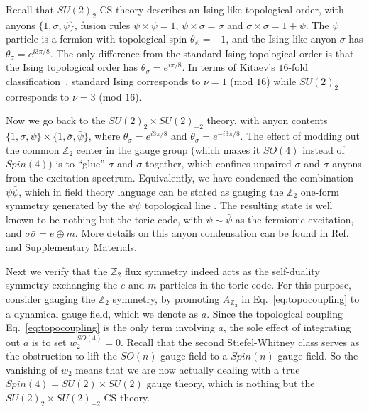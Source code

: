 \documentclass[aps, prl, superscriptaddress, twocolumn,
notitlepage, longbibliography,
floatfix]{revtex4-2}
\newcommand{\1}{\text{\uppercase\expandafter{\romannumeral1}}}
\newcommand{\2}{\text{\uppercase\expandafter{\romannumeral2}}}
\newcommand{\3}{\text{\uppercase\expandafter{\romannumeral3}}}
\newcommand{\4}{\text{\uppercase\expandafter{\romannumeral4}}}
\newcommand{\5}{\text{\uppercase\expandafter{\romannumeral5}}}
\newcommand{\6}{\text{\uppercase\expandafter{\romannumeral6}}}
\def\Z{\mathbb{Z}}
\begin{document}
Recall that $SU(2)_2$ CS theory describes an Ising-like topological order, with anyons $\{1,\sigma,\psi\}$, fusion rules $\psi\times \psi= 1$, $\psi\times \sigma= \sigma$ and $\sigma\times\sigma= 1+\psi$. The $\psi$ particle is a fermion with topological spin $\theta_{\psi}=-1$, and the Ising-like anyon $\sigma$ has $\theta_{\sigma}=e^{i3\pi/8}$. The only difference from the standard Ising topological order is that the Ising topological order has $\theta_{\sigma}=e^{i\pi/8}$. In terms of Kitaev's $16$-fold classification~\cite{Kitaev:2005hzj}, standard Ising corresponds to $\nu=1$ (mod $16$) while $SU(2)_2$ corresponds to $\nu=3$ (mod $16$).

Now we go back to the $SU(2)_2\times SU(2)_{-2}$ theory, with anyon contents $\{1,\sigma,\psi\}\times \{1,\bar{\sigma},\bar{\psi}\}$, where $\theta_{\sigma}=e^{i3\pi/8}$ and $\theta_{\bar{\sigma}}=e^{-i3\pi/8}$. The effect of modding out the common $\Z_2$ center in the gauge group (which makes it $SO(4)$ instead of $Spin(4)$) is to ``glue'' $\sigma$ and $\bar{\sigma}$ together, which confines unpaired $\sigma$ and $\bar{\sigma}$ anyons from the excitation spectrum.  Equivalently, we have condensed the combination $\psi\bar{\psi}$, which in field theory language can be stated as gauging the $\Z_2$ one-form symmetry generated by the $\psi\bar{\psi}$ topological line \cite{BhardwajGaiottoKapustin2017}. The resulting state is well known to be nothing but the toric code, with $\psi\sim\bar{\psi}$ as the fermionic excitation, and $\sigma\bar{\sigma}=e\oplus m$. More details on this anyon condensation can be found in Ref.~\cite{bais2009condensate} and Supplementary Materials.

Next we verify that the $\Z_2$ flux symmetry indeed acts as the self-duality symmetry exchanging the $e$ and $m$ particles in the toric code. For this purpose, consider gauging the $\Z_2$ symmetry, by promoting $A_{\Z_2}$ in Eq.~\eqref{eq:topocoupling} to a dynamical gauge field, which we denote as $a$. Since the topological coupling Eq.~\eqref{eq:topocoupling} is the only term involving $a$, the sole effect of integrating out $a$ is to set $w_2^{SO(4)}=0$. Recall that the second Stiefel-Whitney class serves as the obstruction to lift the $SO(n)$ gauge field to a $Spin(n)$ gauge field. So the vanishing of $w_2$ means that we are now actually dealing with a true $Spin(4)=SU(2)\times SU(2)$ gauge theory, which is nothing but the $SU(2)_2\times SU(2)_{-2}$ CS theory.
\end{document}
